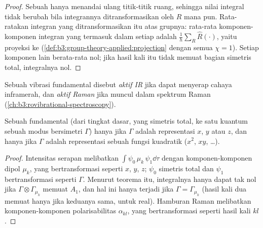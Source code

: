 \begin{proof}
Sebuah  hanya menandai ulang titik-titik ruang, sehingga nilai
integral tidak berubah bila integrannya ditransformasikan oleh $R$ mana pun.
Rata-ratakan integran yang ditransformasikan itu atas grupnya: rata-rata
komponen-komponen integran yang termasuk dalam setiap  adalah $\frac1h\sum_R\hat R(\cdot)$, yaitu proyeksi ke  (\cref{def:b3:group-theory-applied:projection} dengan semua
$\chi = 1$). Setiap komponen lain berata-rata nol; jika hasil kali itu tidak
memuat bagian simetris total, integralnya nol.
\end{proof}

\begin{definition}\label{def:b3:group-theory-applied:activity}
Sebuah vibrasi fundamental disebut \emph{aktif IR} jika dapat
menyerap cahaya inframerah, dan \emph{aktif Raman} jika
muncul dalam spektrum Raman (\cref{ch:b3:rovibrational-spectroscopy}).
\end{definition}

\begin{corollary}\label{cor:b3:group-theory-applied:ir-raman}
Sebuah fundamental (dari tingkat dasar, yang simetris total, ke satu kuantum
sebuah modus bersimetri $\Gamma$) hanya  jika $\Gamma$ adalah
representasi $x$, $y$ atau $z$, dan hanya  jika $\Gamma$ adalah
representasi sebuah fungsi kuadratik ($x^2$, $xy$, \dots).
\end{corollary}

\begin{proof}
Intensitas serapan melibatkan $\int\psi_0\,\mu_k\,\psi_1\dd\tau$ dengan
komponen-komponen dipol $\mu_k$, yang bertransformasi seperti $x$, $y$, $z$;
$\psi_0$ simetris total dan $\psi_1$ bertransformasi seperti $\Gamma$. Menurut
teorema itu, integralnya hanya dapat tak nol jika $\Gamma\otimes\Gamma_{\mu_k}$
memuat $A_1$, dan hal ini hanya terjadi jika $\Gamma =
\Gamma_{\mu_k}$ (hasil kali dua  memuat  hanya jika keduanya sama, untuk  real). Hamburan Raman
melibatkan komponen-komponen polarisabilitas $\alpha_{kl}$, yang
bertransformasi seperti hasil kali $kl$.
\end{proof}

